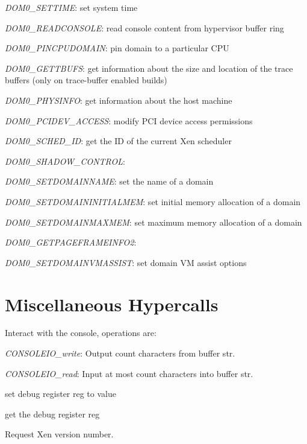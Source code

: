 \documentclass[11pt,twoside,final,openright]{xenstyle}
\begin{document}
{\it DOM0\_SETTIME}: set system time

{\it DOM0\_READCONSOLE}: read console content from hypervisor buffer ring

{\it DOM0\_PINCPUDOMAIN}: pin domain to a particular CPU

{\it DOM0\_GETTBUFS}: get information about the size and location of
                      the trace buffers (only on trace-buffer enabled builds)

{\it DOM0\_PHYSINFO}: get information about the host machine

{\it DOM0\_PCIDEV\_ACCESS}: modify PCI device access permissions

{\it DOM0\_SCHED\_ID}: get the ID of the current Xen scheduler

{\it DOM0\_SHADOW\_CONTROL}:

{\it DOM0\_SETDOMAINNAME}: set the name of a domain

{\it DOM0\_SETDOMAININITIALMEM}: set initial memory allocation of a domain

{\it DOM0\_SETDOMAINMAXMEM}: set maximum memory allocation of a domain

{\it DOM0\_GETPAGEFRAMEINFO2}:

{\it DOM0\_SETDOMAINVMASSIST}: set domain VM assist options




\section{Miscellaneous Hypercalls} 



Interact with the console, operations are:

{\it CONSOLEIO\_write}: Output count characters from buffer str.

{\it CONSOLEIO\_read}: Input at most count characters into buffer str.




set debug register reg to value



 get the debug register reg



Request Xen version number.
\end{document}
